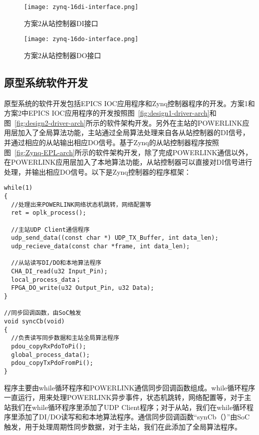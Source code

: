 \begin{figure}[!htb]
  \centering
  \texttt{[image: zynq-16di-interface.png]}
  \caption{方案2从站控制器DI接口}
  \label{fig:zynq-16di-interface}
\end{figure}

\begin{figure}[!htb]
  \centering
  \texttt{[image: zynq-16do-interface.png]}
  \caption{方案2从站控制器DO接口}
  \label{fig:zynq-16do-interface}
\end{figure}

\subsection{原型系统软件开发}

\label{subsection:原型系统软件开发}

原型系统的软件开发包括EPICS IOC应用程序和Zynq控制器程序的开发。方案1和方案2中EPICS IOC应用程序的开发按照图~\ref{fig:design1-driver-arch}和图~\ref{fig:design2-driver-arch}所示的软件架构开发。另外在主站的POWERLINK应用层加入了全局算法功能，主站通过全局算法处理来自各从站控制器的DI信号，并通过相应的从站输出相应DO信号。基于Zynq的从站控制器程序按照图~\ref{fig:Zynq-EPL-arch}所示的软件架构开发，除了完成POWERLINK通信以外，在POWERLINK应用层加入了本地算法功能，从站控制器可以直接对DI信号进行处理，并输出相应DO信号。以下是Zynq控制器的程序框架：
\begin{lstlisting}
while(1)
{ 
  //处理出来POWERLINK网络状态机跳转，网络配置等
  ret = oplk_process();

  //主站UDP Client通信程序
  udp_send_data((const char *) UDP_TX_Buffer, int data_len);
  udp_recieve_data(const char *frame, int data_len);

  //从站读写DI/DO和本地算法程序
  CHA_DI_read(u32 Input_Pin);
  local_process_data；
  FPGA_DO_write(u32 Output_Pin, u32 Data);
}

//同步回调函数，由SoC触发
void syncCb(void)
{
  //负责读写同步数据和主站全局算法程序
  pdou_copyRxPdoToPi();
  global_process_data();
  pdou_copyTxPdoFromPi();
}
\end{lstlisting}

程序主要由while循环程序和POWERLINK通信同步回调函数组成。while循环程序一直运行，用来处理POWERLINK异步事件，状态机跳转，网络配置等，对于主站我们在while循环程序里添加了UDP Client程序；对于从站，我们在while循环程序里添加了DI/DO读写和和本地算法程序。通信同步回调函数“synCb（）”由SoC触发，用于处理周期性同步数据，对于主站，我们在此添加了全局算法程序。


